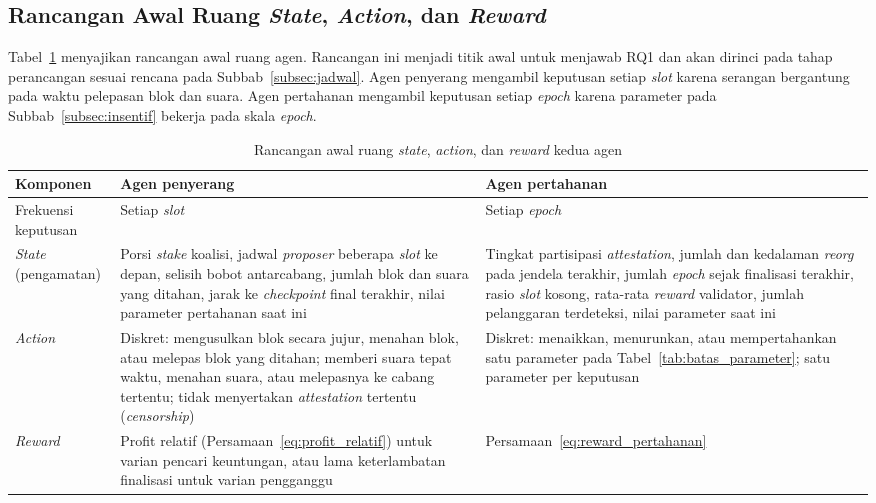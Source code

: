 \subsection{Rancangan Awal Ruang \textit{State}, \textit{Action}, dan \textit{Reward}}
\label{subsec:rancangan_agen}
Tabel~\ref{tab:rancangan_agen} menyajikan rancangan awal ruang agen. Rancangan ini menjadi titik awal untuk menjawab RQ1 dan akan dirinci pada tahap perancangan sesuai rencana pada Subbab~\ref{subsec:jadwal}. Agen penyerang mengambil keputusan setiap \textit{slot} karena serangan bergantung pada waktu pelepasan blok dan suara. Agen pertahanan mengambil keputusan setiap \textit{epoch} karena parameter pada Subbab~\ref{subsec:insentif} bekerja pada skala \textit{epoch}.

\begin{table}[htbp]
\centering
\caption{Rancangan awal ruang \textit{state}, \textit{action}, dan \textit{reward} kedua agen}
\label{tab:rancangan_agen}
\small
\begin{tabular}{|p{2.1cm}|p{5.8cm}|p{5.8cm}|}
\hline
\textbf{Komponen} & \textbf{Agen penyerang} & \textbf{Agen pertahanan} \\
\hline
Frekuensi keputusan & Setiap \textit{slot} & Setiap \textit{epoch} \\
\hline
\textit{State} (pengamatan) & Porsi \textit{stake} koalisi, jadwal \textit{proposer} beberapa \textit{slot} ke depan, selisih bobot antarcabang, jumlah blok dan suara yang ditahan, jarak ke \textit{checkpoint} final terakhir, nilai parameter pertahanan saat ini & Tingkat partisipasi \textit{attestation}, jumlah dan kedalaman \textit{reorg} pada jendela terakhir, jumlah \textit{epoch} sejak finalisasi terakhir, rasio \textit{slot} kosong, rata-rata \textit{reward} validator, jumlah pelanggaran terdeteksi, nilai parameter saat ini \\
\hline
\textit{Action} & Diskret: mengusulkan blok secara jujur, menahan blok, atau melepas blok yang ditahan; memberi suara tepat waktu, menahan suara, atau melepasnya ke cabang tertentu; tidak menyertakan \textit{attestation} tertentu (\textit{censorship}) & Diskret: menaikkan, menurunkan, atau mempertahankan satu parameter pada Tabel~\ref{tab:batas_parameter}; satu parameter per keputusan \\
\hline
\textit{Reward} & Profit relatif (Persamaan~\eqref{eq:profit_relatif}) untuk varian pencari keuntungan, atau lama keterlambatan finalisasi untuk varian pengganggu & Persamaan~\eqref{eq:reward_pertahanan} \\
\hline
\end{tabular}
\end{table}

